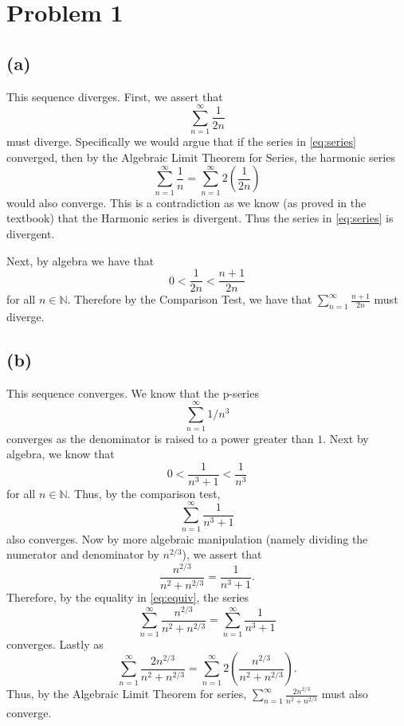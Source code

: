 \documentclass[10pt]{article}
\begin{document}
\section*{Problem 1}
\subsection*{(a)}
This sequence diverges. First, we assert that
\begin{equation}
    \sum_{n=1}^\infty \frac{1}{2n} \label{eq:series}
\end{equation}
 must diverge. Specifically we would argue that if the series in \eqref{eq:series} converged, then by the Algebraic Limit Theorem for Series, the harmonic series
 \begin{equation*}
    \sum_{n=1}^\infty \frac{1}{n} = \sum_{n=1}^\infty2\left (\frac{1}{2n}\right )
 \end{equation*}
 would also converge. This is a contradiction as we know (as proved in the textbook) that the Harmonic series is divergent. Thus the series in \eqref{eq:series} is divergent.

 Next, by algebra we have that
 \begin{equation*}
    0<\frac{1}{2n}<\frac{n+1}{2n}
 \end{equation*}
 for all $n\in\mathbb{N}.$ Therefore by the Comparison Test, we have that $\sum_{n=1}^\infty\frac{n+1}{2n}$ must diverge.

\subsection*{(b)}
This sequence converges.
We know that the p-series 
\begin{equation*}
    \sum_{n=1}^\infty 1/n^3
\end{equation*}
converges as the denominator is raised to a power greater than $1$.
Next by algebra, we know that
\begin{equation*}
    0<\frac{1}{n^3+1}<\frac{1}{n^3}
 \end{equation*}
 for all $n\in\mathbb{N}.$ Thus, by the comparison test, 
 \begin{equation*}
    \sum_{n=1}^\infty \frac{1}{n^3+1}
 \end{equation*}
also converges. 
Now by more algebraic manipulation (namely dividing the numerator and denominator by $n^{2/3}$), we assert that
\begin{equation} \label{eq:equiv}
    \frac{n^{2/3}}{n^2+n^{2/3}}=\frac{1}{n^3+1}.
\end{equation}
Therefore, by the equality in \eqref{eq:equiv}, the series
\begin{equation*}
    \sum_{n=1}^\infty \frac{n^{2/3}}{n^2+n^{2/3}} = \sum_{n=1}^\infty\frac{1}{n^3+1}
\end{equation*}
converges. Lastly as
\begin{equation*}
    \sum_{n=1}^\infty \frac{2n^{2/3}}{n^2+n^{2/3}} = \sum_{n=1}^\infty 2\left(\frac{n^{2/3}}{n^2+n^{2/3}}\right).
\end{equation*}
Thus, by the Algebraic Limit Theorem for series, $\sum_{n=1}^\infty \frac{2n^{2/3}}{n^2+n^{2/3}}$ must also converge.
\end{document}
